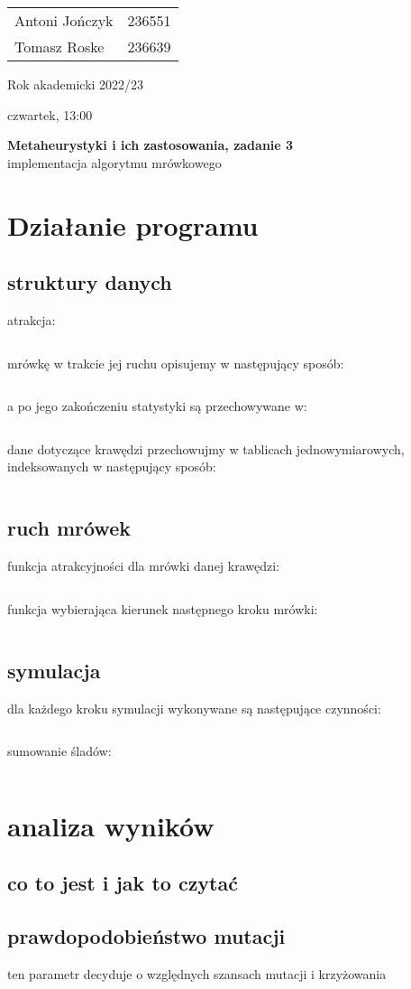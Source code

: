 \documentclass{article}
\begin{document}
\begin{minipage}{0.35\linewidth}
	\begin{tabular}{lr}
		Antoni Jończyk & 236551 \\
		Tomasz Roske   & 236639
	\end{tabular} \hfill
\end{minipage}
\hfill
\begin{minipage}{0.35\linewidth}
	\hfill Rok akademicki 2022/23 \par
	\hfill czwartek, 13:00
\end{minipage}
\bigskip \bigskip \bigskip \bigskip \bigskip
\begin{center}
	\textbf{Metaheurystyki i ich zastosowania, zadanie 3}\\
	\bigskip
	\large implementacja algorytmu mrówkowego
\end{center}
\bigskip \bigskip
\section{Działanie programu}

\subsection{struktury danych}
\indent
atrakcja:
\inputminted{fsharp}{snippets/Program.fsx_atrakcja}
mrówkę w trakcie jej ruchu opisujemy w następujący sposób:
\inputminted{fsharp}{snippets/Program.fsx_antr}
a po jego zakończeniu statystyki są przechowywane w:
\inputminted{fsharp}{snippets/Program.fsx_ants}
dane dotyczące krawędzi przechowujmy w tablicach jednowymiarowych, indeksowanych w następujący sposób:
\inputminted{fsharp}{snippets/Program.fsx_index}

\subsection{ruch mrówek}
funkcja atrakcyjności dla mrówki danej krawędzi:
\inputminted{fsharp}{snippets/Program.fsx_liek}
funkcja wybierająca kierunek następnego kroku mrówki:
\inputminted{fsharp}{snippets/Program.fsx_dir}

\subsection{symulacja}
dla każdego kroku symulacji wykonywane są następujące czynności:
\inputminted{fsharp}{snippets/Program.fsx_advance}
sumowanie śladów:
\inputminted{fsharp}{snippets/Program.fsx_trails}


\section{analiza wyników}
\subsection{co to jest i jak to czytać}
\subsection{prawdopodobieństwo mutacji}
ten parametr decyduje o względnych szansach mutacji i krzyżowania
\\
\end{document}
